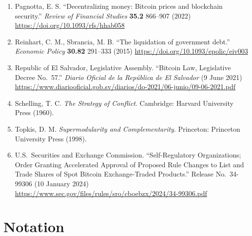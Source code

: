 \documentclass[12pt]{article}
\theoremstyle{definition}
\theoremstyle{remark}
\begin{document}
\begin{enumerate}[leftmargin=*,labelsep=0.5em,label=\arabic*.]
\item Pagnotta, E. S. ``Decentralizing money: Bitcoin prices and
blockchain security.'' \emph{Review of Financial Studies}
\textbf{35.2} 866--907 (2022)
\url{https://doi.org/10.1093/rfs/hhab058}

\item Reinhart, C. M., Sbrancia, M. B. ``The liquidation of
government debt.'' \emph{Economic Policy} \textbf{30.82}
291--333 (2015) \url{https://doi.org/10.1093/epolic/eiv003}

\item Republic of El Salvador, Legislative Assembly. ``Bitcoin
Law, Legislative Decree No.\ 57.'' \emph{Diario Oficial de la
Rep\'ublica de El Salvador} (9 June 2021)
\url{https://www.diariooficial.gob.sv/diarios/do-2021/06-junio/09-06-2021.pdf}

\item Schelling, T. C. \emph{The Strategy of Conflict}. Cambridge:
Harvard University Press (1960).

\item Topkis, D. M. \emph{Supermodularity and Complementarity}.
Princeton: Princeton University Press (1998).

\item U.S.\ Securities and Exchange Commission. ``Self-Regulatory
Organizations; Order Granting Accelerated Approval of Proposed
Rule Changes to List and Trade Shares of Spot Bitcoin
Exchange-Traded Products.'' Release No.\ 34-99306
(10 January 2024)
\url{https://www.sec.gov/files/rules/sro/cboebzx/2024/34-99306.pdf}


\end{enumerate}


\appendix

\section{Notation}
\end{document}
